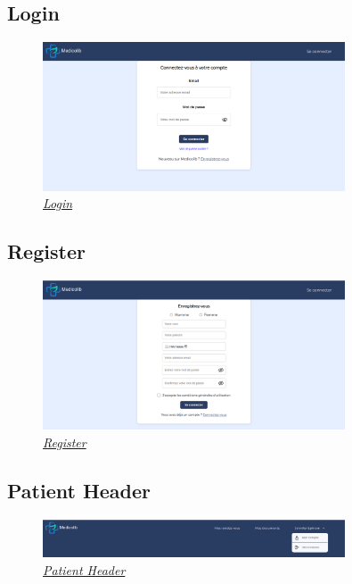 \documentclass[a4paper]{report}
\begin{document}
\subsection{Login}
\begin{figure}[H]
    \vspace{-10pt}
    \centering
    \includegraphics[width=0.8\textwidth]{captures/login.png}
    \caption{\textit{\hyperref[login]{Login}}}
    \label{fig:DCU11}
\end{figure}

\subsection{Register}
\begin{figure}[H]
    \vspace{-10pt}
    \centering
    \includegraphics[width=0.8\textwidth]{captures/register.png}
    \caption{\textit{\hyperref[register]{Register}}}
    \label{fig:DCU12}
\end{figure}

\subsection{Patient Header}
\begin{figure}[H]
    \vspace{-10pt}
    \centering
    \includegraphics[width=0.8\textwidth]{captures/patient-header.png}
    \caption{\textit{\hyperref[header]{Patient Header}}}
    \label{fig:DCU13}
\end{figure}
\end{document}
